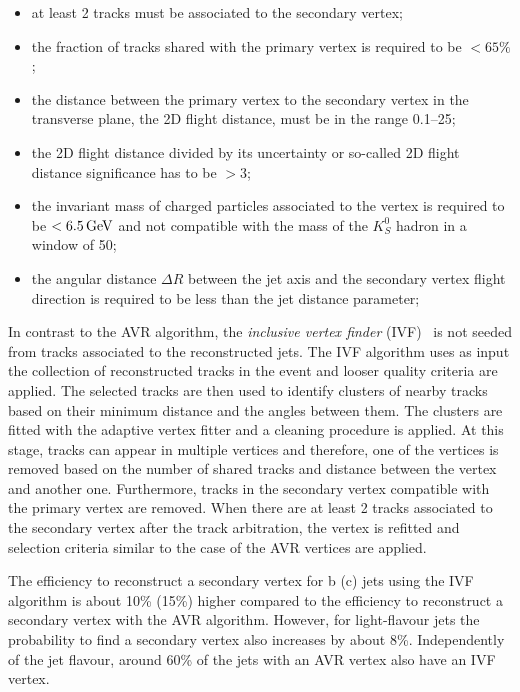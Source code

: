 \begin{itemize}
\item at least 2 tracks must be associated to the secondary vertex;
\item the fraction of tracks shared with the primary vertex is required to be $< 65\%$;
\item the distance between the primary vertex to the secondary vertex in the transverse plane, the 2D flight distance, must be in the range 0.1--25\mm;
\item the 2D flight distance divided by its uncertainty or so-called 2D flight distance significance has to be $> 3$;
\item the invariant mass of charged particles associated to the vertex is required to be $< 6.5\,\text{Ge\hspace{-.08em}V}$ and not compatible with the mass of the $K^0_S$ hadron in a window of 50\MeV;
\item the angular distance $\Delta R$ between the jet axis and the secondary vertex flight direction is required to be less than the jet distance parameter;
\end{itemize}

In contrast to the AVR algorithm, the \textit{inclusive vertex finder} (IVF)~\cite{Khachatryan:2011wq} is not seeded from tracks associated to the reconstructed jets. The IVF algorithm uses as input the collection of reconstructed tracks in the event and looser quality criteria are applied. The selected tracks are then used to identify clusters of nearby tracks based on their minimum distance and the angles between them. The clusters are fitted with the adaptive vertex fitter and a cleaning procedure is applied. At this stage, tracks can appear in multiple vertices and therefore, one of the vertices is removed based on the number of shared tracks and distance between the vertex and another one. Furthermore, tracks in the secondary vertex compatible with the primary vertex are removed. When there are at least 2 tracks associated to the secondary vertex after the track arbitration, the vertex is refitted and selection criteria similar to the case of the AVR vertices are applied.

 The efficiency to reconstruct a secondary vertex for b (c) jets using the IVF algorithm is about 10\% (15\%) higher compared to the efficiency to reconstruct a secondary vertex with the AVR algorithm. However, for light-flavour jets the probability to find a secondary vertex also increases by about 8\%. Independently of the jet flavour, around 60\% of the jets with an AVR vertex also have an IVF vertex.\\
 
